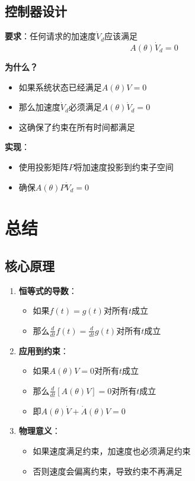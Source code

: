 \documentclass[12pt,a4paper]{article}
\begin{document}
\subsection{控制器设计}

\textbf{要求}：任何请求的加速度$\dot{V}_d$应该满足
\begin{equation}
A(\theta)\dot{V}_d = 0
\end{equation}

\textbf{为什么？}
\begin{itemize}
\item 如果系统状态已经满足$A(\theta)V = 0$
\item 那么加速度$\dot{V}_d$必须满足$A(\theta)\dot{V}_d = 0$
\item 这确保了约束在所有时间都满足
\end{itemize}

\textbf{实现}：
\begin{itemize}
\item 使用投影矩阵$P$将加速度投影到约束子空间
\item 确保$A(\theta)P\dot{V}_d = 0$
\end{itemize}

\section{总结}

\subsection{核心原理}

\begin{enumerate}
\item \textbf{恒等式的导数}：
\begin{itemize}
\item 如果$f(t) = g(t)$对所有$t$成立
\item 那么$\frac{d}{dt}f(t) = \frac{d}{dt}g(t)$对所有$t$成立
\end{itemize}

\item \textbf{应用到约束}：
\begin{itemize}
\item 如果$A(\theta)V = 0$对所有$t$成立
\item 那么$\frac{d}{dt}[A(\theta)V] = 0$对所有$t$成立
\item 即$A(\theta)\dot{V} + \dot{A}(\theta)V = 0$
\end{itemize}

\item \textbf{物理意义}：
\begin{itemize}
\item 如果速度满足约束，加速度也必须满足约束
\item 否则速度会偏离约束，导致约束不再满足
\end{itemize}
\end{enumerate}
\end{document}
